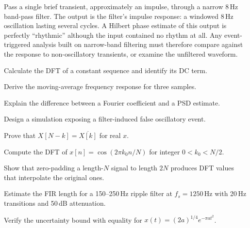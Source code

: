 \begin{workedexample}
Pass a single brief transient, approximately an impulse, through a narrow 8\,Hz band-pass filter. The output is the filter's impulse response: a windowed 8\,Hz oscillation lasting several cycles. A Hilbert phase estimate of this output is perfectly ``rhythmic'' although the input contained no rhythm at all. Any event-triggered analysis built on narrow-band filtering must therefore compare against the response to non-oscillatory transients, or examine the unfiltered waveform.
\end{workedexample}
\begin{exercises}
\item Calculate the DFT of a constant sequence and identify its DC term.
\item Derive the moving-average frequency response for three samples.
\item Explain the difference between a Fourier coefficient and a PSD estimate.
\item Design a simulation exposing a filter-induced false oscillatory event.
\item Prove that $X[N-k]=\overline{X[k]}$ for real $x$.
\item Compute the DFT of $x[n]=\cos(2\pi k_0n/N)$ for integer $0<k_0<N/2$.
\item Show that zero-padding a length-$N$ signal to length $2N$ produces DFT values that interpolate the original ones.
\item Estimate the FIR length for a 150--250\,Hz ripple filter at $f_s=1250$\,Hz with 20\,Hz transitions and 50\,dB attenuation.
\item Verify the uncertainty bound with equality for $x(t)=(2a)^{1/4}e^{-\pi at^2}$.
\end{exercises}
